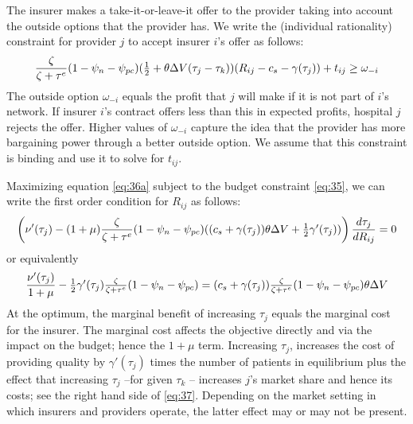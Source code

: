 \documentclass[a4paper,12pt]{article}
\begin{document}
The insurer makes a take-it-or-leave-it offer to the provider taking into account the outside options that the provider has. We write the (individual rationality) constraint for provider \(j\) to accept insurer \(i\)'s offer as follows:
\begin{equation}
\label{eq:7}
\frac{\zeta}{\zeta+\tau^e}(1-\psi_n-\psi_{pc})( \textstyle{1\over 2} + \theta \Delta V (\tau_j - \tau_k))(R_{ij}-c_s-\gamma(\tau_j) ) + t_{ij} \geq \omega_{-i}
\end{equation}
The outside option \(\omega_{-i}\) equals the profit that \(j\) will make if it is not part of \(i\)'s network. If insurer \(i\)'s contract offers less than this in expected profits, hospital \(j\) rejects the offer. Higher values of \(\omega_{-i}\) capture the idea that the provider has more bargaining power through a better outside option. We assume that this constraint is binding and use it to solve for \(t_{ij}\).

Maximizing equation \eqref{eq:36a} subject to the budget constraint \eqref{eq:35}, we can write the first order condition for \(R_{ij}\) as follows:
\begin{equation}
\label{eq:10}
\left( \nu'(\tau_j) - (1+\mu) \frac{\zeta}{\zeta+\tau^e}(1-\psi_n-\psi_{pc}) ( (c_s+\gamma(\tau_j)) \theta \Delta V + \textstyle{1\over 2} \gamma'(\tau_j) ) \right) \frac{d\tau_j}{dR_{ij}} = 0
\end{equation}
or equivalently
\begin{equation}
\label{eq:37} 
\frac{\nu'(\tau_j)}{1+\mu} - \textstyle{1\over 2} \gamma'(\tau_j) \frac{\zeta}{\zeta+\tau^e}(1-\psi_n-\psi_{pc}) = (c_s+\gamma(\tau_j)) \frac{\zeta}{\zeta+\tau^e} (1-\psi_n -\psi_{pc})\theta \Delta V
\end{equation}
At the optimum, the marginal benefit of increasing \(\tau_j\) equals the marginal cost for the insurer. The marginal cost affects the objective directly and via the impact on the budget; hence the \(1+\mu\) term. Increasing \(\tau_j\), increases the cost of providing quality by \(\gamma'(\tau_j)\) times the number of patients in equilibrium plus the effect that increasing \(\tau_j\) --for given \(\tau_k\) -- increases \(j\)'s market share and hence its costs; see the right hand side of \eqref{eq:37}. Depending on the market setting in which insurers and providers operate, the latter effect may or may not be present.
\end{document}
